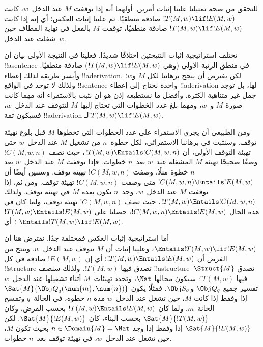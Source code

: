 \documentclass[../../../include/open-logic-section]{subfiles}
\begin{document}

\begin{explain}
للتحقق من صحة تمثيلنا علينا إثبات أمرين. أولهما أنه إذا توقفت $M$ عند
الدخل~$w$، كانت $!T(M,w)\lif !E(M,w)$ صادقة منطقيًا. ثم علينا إثبات
العكس؛ أي إنه إذا كانت $!T(M,w)\lif !E(M,w)$ صادقة منطقيًا، توقفت
$M$ بالفعل في نهاية المطاف حين شغلت عند الدخل~$w$.

تختلف استراتيجية إثبات النتيجتين اختلافًا شديدًا. فعلينا في النتيجة
الأولى بيان أن !!a{sentence} في منطق الرتبة الأولى (وهي
$!T(M,w)\lif !E(M,w)$) صادقة منطقيًا. وأيسر طريقة لذلك إعطاء
!!a{derivation}. لكن يفترض أن ينجح برهاننا لكل $M$ و$w$؛ ولذلك لا
توجد في الواقع !!{sentence} واحدة نحتاج إلى إعطاء !!a{derivation}
لها، بل توجد جمل غير متناهية الكثرة. وأفضل ما نستطيعه إذن هو أن نثبت
بالاستقراء أنه مهما كانت صورة $M$ و~$w$، ومهما بلغ عدد الخطوات التي
تحتاج إليها $M$ لتتوقف عند الدخل~$w$، فسيكون ثمة !!a{derivation}
لـ$!T(M,w)\lif !E(M,w)$.

ومن الطبيعي أن يجري الاستقراء على عدد الخطوات التي تخطوها $M$ قبل
بلوغ تهيئة توقف. وسنثبت في برهاننا الاستقرائي، لكل خطوة~$n$ من تشغيل
$M$ عند الدخل~$w$ حتى تهيئة التوقف الأولى، أن
$!T(M,w)\Entails !C(M,w,n)$، حيث تصف $!C(M,w,n)$ وصفًا صحيحًا تهيئة
$M$ المشغلة عند~$w$ بعد~$n$ خطوات. فإذا توقفت $M$ عند الدخل~$w$ بعد
$n$ خطوة مثلًا، وصفت $!C(M,w,n)$ تهيئة توقف. وسنبين أيضًا أن
$!C(M,w,n)\Entails !E(M,w)$ متى وصفت $!C(M,w,n)$ تهيئة توقف. ومن
ثم، إذا توقفت $M$ عند الدخل~$w$، وجد~$n$ تكون بعده $M$ في تهيئة
توقف. ولذلك $!T(M,w)\Entails !C(M,w,n)$، حيث تصف $!C(M,w,n)$ تهيئة
توقف، ولما كان في هذه الحال $!C(M,w,n)\Entails !E(M,w)$، حصلنا على
$!T(M,w)\Entails !E(M,w)$؛ أي
$\Entails !T(M,w)\lif !E(M,w)$.

أما استراتيجية إثبات العكس فمختلفة جدًا. نفترض هنا أن
$\Entails !T(M,w)\lif !E(M,w)$، وعلينا إثبات أن $M$ تتوقف عند
الدخل~$w$. وينتج من الفرض أن $!T(M,w)\Entails !E(M,w)$؛ أي إن
$!E(M,w)$ صادقة في كل !!{structure} تصدق فيها $!T(M,w)$. ولذلك سنصف
!!a{structure}~$\Struct{M}$ تصدق فيها $!T(M,w)$: سيكون مجالها
$\Nat$، وتحدد تهيئات~$M$ أثناء تشغيلها عند الدخل~$w$ تفسير جميع
$\Obj Q_q$ و$\Obj S_\sigma$. فمثلًا يكون
$\Sat{M}{\Obj Q_q(\num{m},\num{n})}$ إذا وفقط إذا كانت $M$، حين
تشغل عند الدخل~$w$ مدة $n$ خطوة، في الحالة~$q$ وتمسح الخانة~$m$.
ولما كان $!T(M,w)\Entails !E(M,w)$ بحسب الفرض، وكان
$\Sat{M}{!T(M,w)}$ بحسب البناء، كان $\Sat{M}{!E(M,w)}$. لكن
$\Sat{M}{!E(M,w)}$ إذا وفقط إذا وجد $n\in\Domain{M}=\Nat$ بحيث تكون
$M$، حين تشغل عند الدخل~$w$، في تهيئة توقف بعد~$n$ خطوات.
\end{explain}
\end{document}

